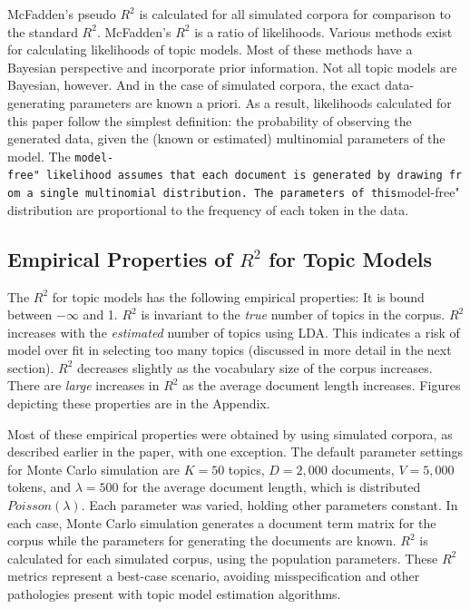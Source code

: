 \documentclass[conference,final,]{IEEEtran}
\begin{document}
McFadden's pseudo \(R^2\) is calculated for all simulated corpora for
comparison to the standard \(R^2\). McFadden's \(R^2\) is a ratio of
likelihoods. Various methods exist for calculating likelihoods of topic
models. \cite{buntine09} Most of these methods have a Bayesian
perspective and incorporate prior information. Not all topic models are
Bayesian, however. And in the case of simulated corpora, the exact
data-generating parameters are known a priori. As a result, likelihoods
calculated for this paper follow the simplest definition: the
probability of observing the generated data, given the (known or
estimated) multinomial parameters of the model. The
\texttt{model-free"\ likelihood\ assumes\ that\ each\ document\ is\ generated\ by\ drawing\ from\ a\ single\ multinomial\ distribution.\ The\ parameters\ of\ this}model-free"
distribution are proportional to the frequency of each token in the
data.

\subsection{Empirical Properties of $R^2$ for Topic Models}

The \(R^2\) for topic models has the following empirical properties: It
is bound between \(-\infty\) and 1. \(R^2\) is invariant to the
\textit{true} number of topics in the corpus. \(R^2\) increases with the
\textit{estimated} number of topics using LDA. This indicates a risk of
model over fit in selecting too many topics (discussed in more detail in
the next section). \(R^2\) decreases slightly as the vocabulary size of
the corpus increases. There are \textit{large} increases in \(R^2\) as
the average document length increases. Figures depicting these
properties are in the Appendix.

Most of these empirical properties were obtained by using simulated
corpora, as described earlier in the paper, with one exception. The
default parameter settings for Monte Carlo simulation are \(K = 50\)
topics, \(D = 2,000\) documents, \(V = 5,000\) tokens, and
\(\lambda = 500\) for the average document length, which is distributed
\(Poisson(\lambda)\). Each parameter was varied, holding other
parameters constant. In each case, Monte Carlo simulation generates a
document term matrix for the corpus while the parameters for generating
the documents are known. \(R^2\) is calculated for each simulated
corpus, using the population parameters. These \(R^2\) metrics represent
a best-case scenario, avoiding misspecification and other pathologies
present with topic model estimation algorithms.
\end{document}
